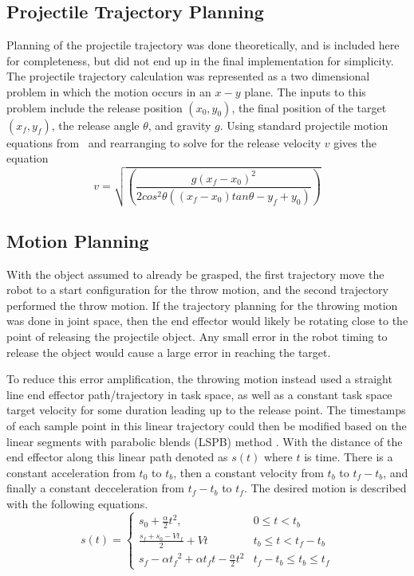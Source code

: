 \documentclass[conference]{IEEEtran}
\begin{document}
\subsection{Projectile Trajectory Planning}
Planning of the projectile trajectory was done theoretically, and is included
here for completeness, but did not end up in the final implementation for
simplicity. The projectile trajectory calculation was represented as a
two dimensional problem in which the motion occurs in an $x-y$ plane. The inputs
to this problem include the release position $(x_0, y_0)$, the final position of
the target $(x_f, y_f)$, the release angle $\theta$, and gravity $g$. Using
standard projectile motion equations from~\cite{william25} and rearranging to
solve for the release velocity $v$ gives the equation
\begin{equation*}
  v = \sqrt{ \left(\frac{g(x_f-x_0)^2}{2 cos^2\theta ((x_f-x_0) tan \theta - y_f + y_0)} \right ) }
\end{equation*}

\subsection{Motion Planning}
With the object assumed to already be grasped, the first trajectory move the
robot to a start configuration for the throw motion, and the second trajectory
performed the throw motion. If the trajectory planning for the throwing motion
was done in joint space, then the end effector would likely be rotating close to
the point of releasing the projectile object. Any small error in the robot
timing to release the object would cause a large error in reaching the target.

To reduce this error amplification, the throwing motion instead used a straight
line end effector path/trajectory in task space, as well as a constant task
space target velocity for some duration leading up to the release point. The
timestamps of each sample point in this linear trajectory could then be modified
based on the linear segments with parabolic blends (LSPB) method
\cite{mark2020control}. With the distance of the end effector along this linear
path denoted as $s(t)$ where $t$ is time. There is a constant acceleration from
$t_0$ to $t_b$, then a constant velocity from $t_b$ to $t_f-t_b$, and finally a
constant decceleration from $t_f-t_b$ to $t_f$. The desired motion is described
with the following equations.
\begin{equation*}
  s(t) =
  \begin{cases}
    s_0+\frac{\alpha}{2}t^2, & 0 \leq t < t_b \\
    \frac{s_f+s_0-Vt_f}{2} + Vt & t_b \leq t < t_f-t_b \\
    s_f-\alpha {t_f}^2+\alpha t_f t-\frac{\alpha}{2} t^2 & t_f-t_b \leq t_b \leq t_f
  \end{cases}
\end{equation*}
\end{document}
